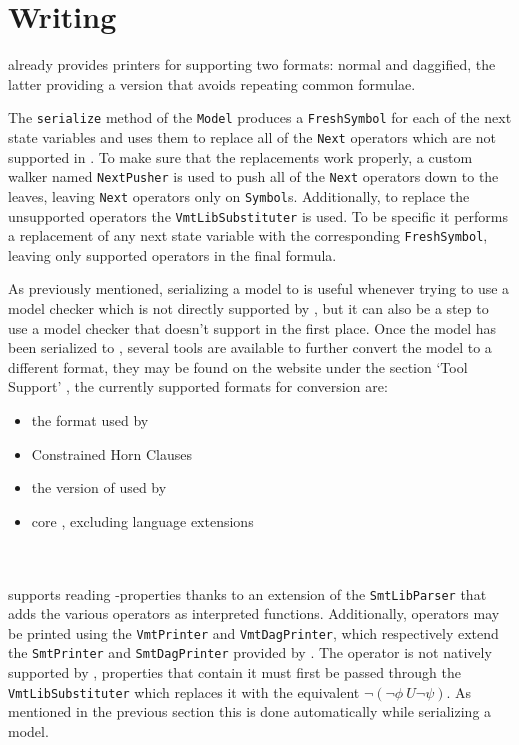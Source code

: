 \section{Writing}
\label{sec:vmtlib-serialization}
\pysmt{} already provides printers for \smtlib{} supporting two formats: normal and daggified, the latter providing a version that avoids repeating common formulae.

The \texttt{serialize} method of the \texttt{Model} produces a \texttt{FreshSymbol} for each of the next state variables and uses them to replace all of the \texttt{Next} operators which are not supported in \vmtlib{}.
To make sure that the replacements work properly, a custom walker named \texttt{NextPusher} is used to push all of the \texttt{Next} operators down to the leaves, leaving \texttt{Next} operators only on \texttt{Symbol}s.
Additionally, to replace the unsupported operators the \texttt{VmtLibSubstituter} is used. To be specific it performs a replacement of any next state variable with the corresponding \texttt{FreshSymbol}, leaving only supported operators in the final formula.

As previously mentioned, serializing a model to \vmtlib{} is useful whenever trying to use a model checker which is not directly supported by \pyvmt{}, but it can also be a step to use a model checker that doesn't support \vmtlib{} in the first place.
Once the model has been serialized to \vmtlib{}, several tools are available to further convert the model to a different format, they may be found on the \vmtlib{} website under the section `Tool Support' \cite{VMT-LIB}, the currently supported formats for conversion are:
\begin{itemize}
    \item \btor{} \cite{DBLP:conf/cav/NiemetzPWB18} the format used by \boolector{}
    \item Constrained Horn Clauses
    \item the version of \smv{} used by \nuxmv{} \cite{DBLP:conf/cav/CavadaCDGMMMRT14}
    \item core \vmtlib{}, excluding language extensions
\end{itemize}

\inputminted[firstline=37, lastline=38]{python3}{py/vmtlib_support.py}

\section{\ltl{}}
\pyvmt{} supports reading \ltl{}-properties thanks to an extension of the \texttt{SmtLibParser} that adds the various operators as interpreted functions. Additionally, \ltl{} operators may be printed using the \texttt{VmtPrinter} and \texttt{VmtDagPrinter}, which respectively extend the \texttt{SmtPrinter} and \texttt{SmtDagPrinter} provided by \pysmt{}. The \fR{} operator is not natively supported by \vmtlib{}, properties that contain it must first be passed through the \texttt{VmtLibSubstituter} which replaces it with the equivalent $\lnot (\lnot \phi\ U \lnot \psi)$. As mentioned in the previous section this is done automatically while serializing a model.


